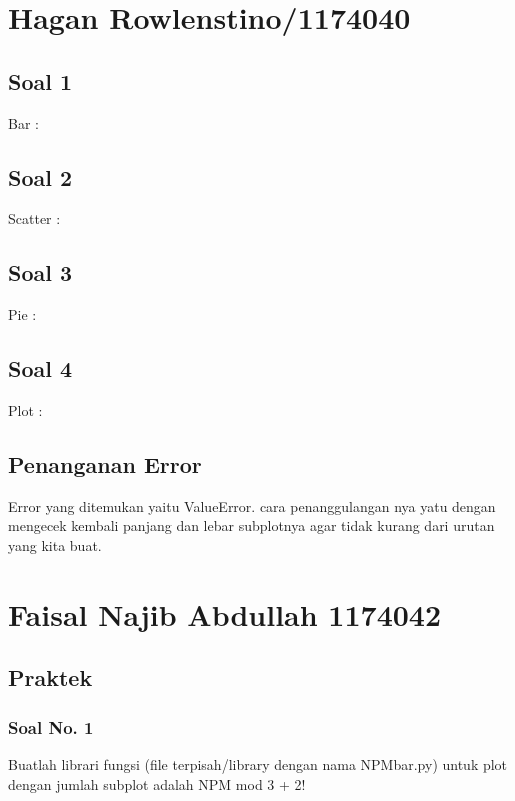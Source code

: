 \section{Hagan Rowlenstino/1174040}
	\subsection{Soal 1}
	Bar :

	

	\subsection{Soal 2}

	Scatter :

	

	\subsection{Soal 3}

	Pie :

	

	\subsection{Soal 4}

	Plot :

	

	\subsection{Penanganan Error}
	Error yang ditemukan yaitu ValueError. cara penanggulangan nya yatu dengan mengecek kembali panjang dan lebar subplotnya agar tidak kurang dari urutan yang kita buat.

	

\section{Faisal Najib Abdullah 1174042}
\subsection{Praktek}
\subsubsection{Soal No. 1}
\hfill \break
Buatlah librari fungsi (file terpisah/library dengan nama NPMbar.py) untuk plot dengan jumlah subplot adalah NPM mod 3 + 2!

